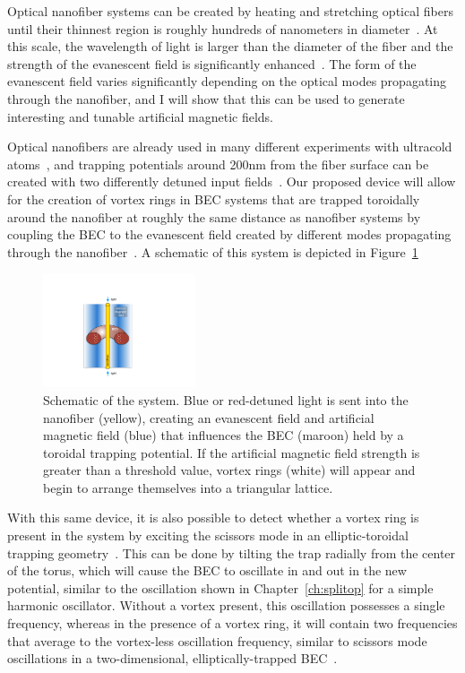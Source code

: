 Optical nanofiber systems can be created by heating and stretching optical fibers until their thinnest region is roughly hundreds of nanometers in diameter~\cite{ward2006, tong2003}.
At this scale, the wavelength of light is larger than the diameter of the fiber and the strength of the evanescent field is significantly enhanced~\cite{yariv1997}.
The form of the evanescent field varies significantly depending on the optical modes propagating through the nanofiber, and I will show that this can be used to generate interesting and tunable artificial magnetic fields.

Optical nanofibers are already used in many different experiments with ultracold atoms~\cite{vetsch2010, lacroute2012, nieddu2016, sague2007, russell2011, kumar2015}, and trapping potentials around 200nm from the fiber surface can be created with two differently detuned input fields~\cite{kien2004, phelan2013}.
Our proposed device will allow for the creation of vortex rings in BEC systems that are trapped toroidally around the nanofiber at roughly the same distance as  nanofiber systems by coupling the BEC to the evanescent field created by different modes propagating through the nanofiber~\cite{sachdeva2017}.
A schematic of this system is depicted in Figure~\ref{fig:device}

\begin{figure}[t]
\begin{center}
\includegraphics[width=0.4\textwidth]{data/3d/Schematic_TB}
\end{center}
\caption{Schematic of the system. Blue or red-detuned light is sent into the nanofiber (yellow), creating an evanescent field and artificial magnetic field (blue) that influences the BEC (maroon) held by a toroidal trapping potential. If the artificial magnetic field strength is greater than a threshold value, vortex rings (white) will appear and begin to arrange themselves into a triangular lattice.}
\label{fig:device}
\end{figure}

With this same device, it is also possible to detect whether a vortex ring is present in the system by exciting the scissors mode in an elliptic-toroidal trapping geometry~\cite{cozzini2003, guery1999, marago2000}.
This can be done by tilting the trap radially from the center of the torus, which will cause the BEC to oscillate in and out in the new potential, similar to the oscillation shown in Chapter~\ref{ch:splitop} for a simple harmonic oscillator.
Without a vortex present, this oscillation possesses a single frequency, whereas in the presence of a vortex ring, it will contain two frequencies that average to the vortex-less oscillation frequency, similar to scissors mode oscillations in a two-dimensional, elliptically-trapped BEC~\cite{smith2004, zambelli1998, stringari2001}.

